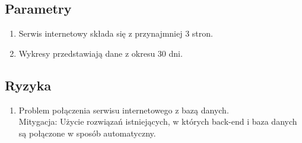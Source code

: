 \documentclass[a4paper,11pt, notitlepage ]{article}
\begin{document}
\subsection{Parametry}
\begin{enumerate}
    \item Serwis internetowy składa się z przynajmniej 3 stron.
    \item Wykresy przedstawiają dane z okresu 30 dni.
\end{enumerate}

\subsection{Ryzyka}
\begin{enumerate}
    \item Problem połączenia serwisu internetowego z bazą danych.\\
Mitygacja: Użycie rozwiązań istniejących, w których back-end i baza danych są połączone w sposób automatyczny.
\end{enumerate}
\end{document}
